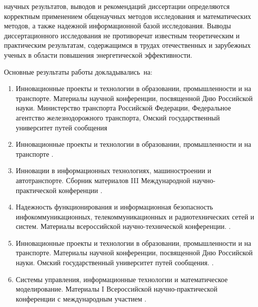 {\reliability} 
научных результатов, выводов и рекомендаций диссертации определяются корректным применением
общенаучных методов исследования и математических методов, а также
надежной информационной базой исследования. Выводы диссертационного исследования не противоречат известным теоретическим и практическим результатам, содержащимся в трудах отечественных и зарубежных ученых в области повышения энергетической эффективности.



{\probation}
Основные результаты работы докладывались~на:
\begin{enumerate}
\item Инновационные проекты и технологии в образовании, промышленности и на транспорте. Материалы научной конференции, посвященной Дню Российской науки. Министерство транспорта Российской Федерации, Федеральное агентство железнодорожного транспорта, Омский государственный университет путей сообщения \cite{Altman2020boundary2}

\item Инновационные проекты и технологии в образовании, промышленности и на транспорте \cite{comparative_study2020}.  

\item Инновации в информационных технологиях, машиностроении и автотранспорте. Сборник материалов III Международной научно-практической конференции \cite{complexity_assessment2019}.

\item Надежность функционирования и информационная безопасность инфокоммуникационных, телекоммуникационных и радиотехнических сетей и систем. Материалы всероссийской научно-технической конференции. \cite{modern_information2019}. 

\item Инновационные проекты и технологии в образовании, промышленности и на транспорте. Материалы научной конференции, посвященной Дню Российской науки. Омский государственный университет путей сообщения. \cite{comparative_analysis2019}.

\item Системы управления, информационные технологии и математическое моделирование. Материалы I Всероссийской научно-практической конференции с международным участием \cite{comparative_analysis_2019}.


\end{enumerate}
